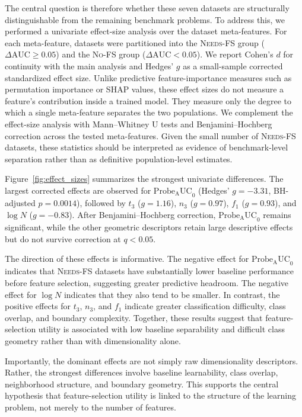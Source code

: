 \documentclass[preprint,12pt,authoryear]{elsarticle}
\begin{document}
The central question is therefore whether these seven datasets are structurally distinguishable from the remaining benchmark problems. To address this, we performed a univariate effect-size analysis over the dataset meta-features. For each meta-feature, datasets were partitioned into the \textsc{Needs-FS} group ($\Delta\mathrm{AUC} \geq 0.05$) and the \textsc{No-FS} group ($\Delta\mathrm{AUC} < 0.05$). We report Cohen’s $d$ for continuity with the main analysis and Hedges’ $g$ as a small-sample corrected standardized effect size. Unlike predictive feature-importance measures such as permutation importance or SHAP values, these effect sizes do not measure a feature’s contribution inside a trained model. They measure only the degree to which a single meta-feature separates the two populations. We complement the effect-size analysis with Mann–Whitney U tests and Benjamini–Hochberg correction across the tested meta-features. Given the small number of \textsc{Needs-FS} datasets, these statistics should be interpreted as evidence of benchmark-level separation rather than as definitive population-level estimates.

Figure~\ref{fig:effect_sizes} summarizes the strongest univariate differences. The largest corrected effects are observed for $\mathrm{Probe_AUC}_0$ (Hedges’ $g=-3.31$, BH-adjusted $p=0.0014$), followed by $t_3$ ($g=1.16$), $n_3$ ($g=0.97$), $f_1$ ($g=0.93$), and $\log N$ ($g=-0.83$). After Benjamini–Hochberg correction, $\mathrm{Probe_AUC}_0$ remains significant, while the other geometric descriptors retain large descriptive effects but do not survive correction at $q<0.05$.

The direction of these effects is informative. The negative effect for $\mathrm{Probe_AUC}_0$ indicates that \textsc{Needs-FS} datasets have substantially lower baseline performance before feature selection, suggesting greater predictive headroom. The negative effect for $\log N$ indicates that they also tend to be smaller. In contrast, the positive effects for $t_3$, $n_3$, and $f_1$ indicate greater classification difficulty, class overlap, and boundary complexity. Together, these results suggest that feature-selection utility is associated with low baseline separability and difficult class geometry rather than with dimensionality alone.

Importantly, the dominant effects are not simply raw dimensionality descriptors. Rather, the strongest differences involve baseline learnability, class overlap, neighborhood structure, and boundary geometry. This supports the central hypothesis that feature-selection utility is linked to the structure of the learning problem, not merely to the number of features.
\end{document}
